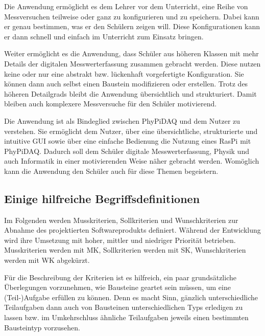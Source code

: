 \documentclass[parskip=full]{scrartcl}
\begin{document}
Die Anwendung ermöglicht es dem Lehrer vor dem Unterricht, eine Reihe von Messversuchen teilweise oder ganz zu konfigurieren und zu speichern. Dabei kann er genau bestimmen, was er den Schülern zeigen will. Diese Konfigurationen kann er dann schnell und einfach im Unterricht zum Einsatz bringen. 

Weiter ermöglicht es die Anwendung, dass Schüler aus höheren Klassen mit mehr Details der digitalen Messwerterfassung zusammen gebracht werden. Diese nutzen keine oder nur eine abstrakt bzw. lückenhaft vorgefertigte Konfiguration. Sie können dann auch selbst einen Baustein modifizieren oder erstellen. Trotz des höheren Detailgrads bleibt die Anwendung übersichtlich und strukturiert. Damit bleiben auch komplexere Messversuche für den Schüler motivierend. 

Die Anwendung ist als Bindeglied zwischen \gls{PhyPiDAQ} und dem Nutzer zu verstehen. Sie ermöglicht dem Nutzer, über eine übersichtliche, strukturierte und intuitive GUI sowie über eine einfache Bedienung die Nutzung eines \gls{RasPi} mit \gls{PhyPiDAQ}. Dadurch soll dem Schüler digitale Messwerterfassung, Physik und auch Informatik in einer motivierenden Weise näher gebracht werden. Womöglich kann die Anwendung den Schüler auch für diese Themen begeistern.  

\subsection{Einige hilfreiche Begriffsdefinitionen}

Im Folgenden werden \gls{Musskriterien}, \gls{Sollkriterien} und \gls{Wunschkriterien} zur Abnahme des projektierten Softwareprodukts definiert. Während der Entwicklung wird ihre Umsetzung mit hoher, mittler und niedriger Priorität betrieben. Musskriterien werden mit MK, Sollkriterien werden mit SK, Wunschkriterien werden mit WK abgekürzt.

\newtheorem{MussKrit}{MK}
\newtheorem{SollKrit}{SK}
\newtheorem{WunschKrit}{WK}

Für die Beschreibung der Kriterien ist es hilfreich, ein paar grundsätzliche Überlegungen vorzunehmen, wie Bausteine geartet sein müssen, um eine (Teil-)Aufgabe erfüllen zu können. Denn es macht Sinn, gänzlich unterschiedliche Teilaufgaben dann auch von Bausteinen unterschiedlichen Typs erledigen zu lassen bzw. im Umkehrschluss ähnliche Teilaufgaben jeweils einen bestimmten Bausteintyp vorzusehen.
\end{document}
